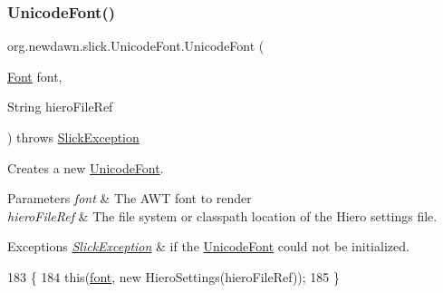 \subsubsection{\texorpdfstring{Unicode\+Font()}{UnicodeFont()}\hspace{0.1cm}{\footnotesize\ttfamily [4/7]}}
{\footnotesize\ttfamily org.\+newdawn.\+slick.\+Unicode\+Font.\+Unicode\+Font (\begin{DoxyParamCaption}\item[{\mbox{\hyperlink{interfaceorg_1_1newdawn_1_1slick_1_1_font}{Font}}}]{font,  }\item[{String}]{hiero\+File\+Ref }\end{DoxyParamCaption}) throws \mbox{\hyperlink{classorg_1_1newdawn_1_1slick_1_1_slick_exception}{Slick\+Exception}}\hspace{0.3cm}{\ttfamily [inline]}}

Creates a new \mbox{\hyperlink{classorg_1_1newdawn_1_1slick_1_1_unicode_font}{Unicode\+Font}}.


\begin{DoxyParams}{Parameters}
{\em font} & The A\+WT font to render \\
\hline
{\em hiero\+File\+Ref} & The file system or classpath location of the Hiero settings file. \\
\hline
\end{DoxyParams}

\begin{DoxyExceptions}{Exceptions}
{\em \mbox{\hyperlink{classorg_1_1newdawn_1_1slick_1_1_slick_exception}{Slick\+Exception}}} & if the \mbox{\hyperlink{classorg_1_1newdawn_1_1slick_1_1_unicode_font}{Unicode\+Font}} could not be initialized. \\
\hline
\end{DoxyExceptions}

\begin{DoxyCode}
183                                                                               \{
184         \textcolor{keyword}{this}(\mbox{\hyperlink{classorg_1_1newdawn_1_1slick_1_1_unicode_font_a956ab491839be375d47444a67ebff11c}{font}}, \textcolor{keyword}{new} HieroSettings(hieroFileRef));
185     \}
\end{DoxyCode}
\mbox{\label{classorg_1_1newdawn_1_1slick_1_1_unicode_font_ac0a63b0fe968143afee7f78911e5030e}} 
